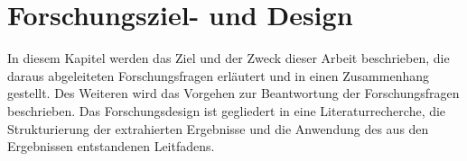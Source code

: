 \chapter{Forschungsziel- und Design}

In diesem Kapitel werden das Ziel und der Zweck dieser Arbeit beschrieben, die daraus abgeleiteten Forschungsfragen erläutert und in einen Zusammenhang gestellt. Des Weiteren wird das Vorgehen zur Beantwortung der Forschungsfragen beschrieben. Das Forschungsdesign ist gegliedert in eine Literaturrecherche, die Strukturierung der extrahierten Ergebnisse und die Anwendung des aus den Ergebnissen entstandenen Leitfadens.





